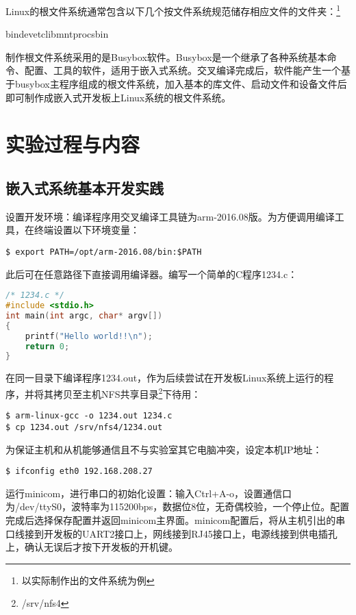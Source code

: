 \documentclass[hyperref,UTF8]{ctexart}
\begin{document}
Linux的根文件系统通常包含以下几个按文件系统规范储存相应文件的文件夹：\footnote{以实际制作出的文件系统为例}

bin\qquad dev\qquad etc\qquad lib\qquad mnt\qquad proc\qquad sbin\qquad

制作根文件系统采用的是Busybox软件。Busybox是一个继承了各种系统基本命令、配置、工具的软件，适用于嵌入式系统。交叉编译完成后，软件能产生一个基于busybox主程序组成的根文件系统，加入基本的库文件、启动文件和设备文件后即可制作成嵌入式开发板上Linux系统的根文件系统。

\section{实验过程与内容}\label{sec:exp-content}

\subsection{嵌入式系统基本开发实践}\label{subsec:basic-exp}
设置开发环境：编译程序用交叉编译工具链为arm-2016.08版。为方便调用编译工具，在终端设置以下环境变量：
\begin{Verbatim}[frame=single]
$ export PATH=/opt/arm-2016.08/bin:$PATH
\end{Verbatim}
此后可在任意路径下直接调用编译器。编写一个简单的C程序1234.c：
\begin{lstlisting}[language=C,flexiblecolumns]
/* 1234.c */
#include <stdio.h>
int main(int argc, char* argv[])
{
    printf("Hello world!!\n");
    return 0;
}
\end{lstlisting}

在同一目录下编译程序1234.out，作为后续尝试在开发板Linux系统上运行的程序，并将其拷贝至主机NFS共享目录\footnote{/srv/nfs4}下待用：
\begin{Verbatim}[frame=single]
$ arm-linux-gcc -o 1234.out 1234.c
$ cp 1234.out /srv/nfs4/1234.out
\end{Verbatim}

为保证主机和从机能够通信且不与实验室其它电脑冲突，设定本机IP地址：
\begin{Verbatim}[frame=single]
$ ifconfig eth0 192.168.208.27
\end{Verbatim}

运行minicom，进行串口的初始化设置：输入Ctrl+A-o，设置通信口为/dev/ttyS0，波特率为115200bps，数据位8位，无奇偶校验，一个停止位。配置完成后选择保存配置并返回minicom主界面。minicom配置后，将从主机引出的串口线接到开发板的UART2接口上，网线接到RJ45接口上，电源线接到供电插孔上，确认无误后才按下开发板的开机键。
\end{document}
